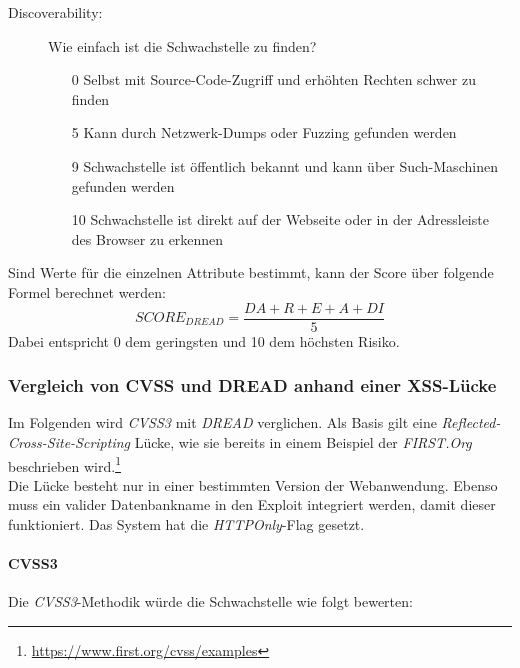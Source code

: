 \begin{description}
			\item[Discoverability: ] Wie einfach ist die Schwachstelle zu finden?
			\begin{itemize}
				\item[0] Selbst mit Source-Code-Zugriff und erhöhten Rechten schwer zu finden
				\item[5] Kann durch Netzwerk-Dumps oder Fuzzing gefunden werden
				\item[9] Schwachstelle ist öffentlich bekannt und kann über Such-Maschinen gefunden werden
				\item[10] Schwachstelle ist direkt auf der Webseite oder in der Adressleiste des Browser zu erkennen
			\end{itemize}
		\end{description}

 Sind Werte für die einzelnen Attribute bestimmt, kann der Score über folgende Formel berechnet werden:\cite{DREADOpenStack}
 \[ 
SCORE_{DREAD} = \frac{DA + R + E + A + DI}{5} 
\]
Dabei entspricht 0 dem geringsten und 10 dem höchsten Risiko.

	\subsubsection{Vergleich von CVSS und DREAD anhand einer XSS-Lücke}
	Im Folgenden wird \textit{CVSS3} mit \textit{DREAD} verglichen. Als Basis gilt eine \textit{Reflected-Cross-Site-Scripting} Lücke, wie sie bereits in einem Beispiel der \textit{FIRST.Org} beschrieben wird.\footnote{\url{https://www.first.org/cvss/examples}}\\
	
	Die Lücke besteht nur in einer bestimmten Version der Webanwendung. Ebenso muss ein valider Datenbankname in den Exploit integriert werden, damit dieser funktioniert. Das System hat die \textit{HTTPOnly}-Flag gesetzt.

	\paragraph{CVSS3}\label{ref:VerglCVSS3}
	Die \textit{CVSS3}-Methodik würde die Schwachstelle wie folgt bewerten:
	
